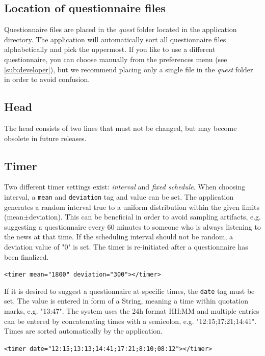 \documentclass[11pt,a4paper,titlepage]{article}
\begin{document}
\subsection{Location of questionnaire files}

Questionnaire files are placed in the \textit{quest} folder located in the application directory. The application will automatically sort all questionnaire files alphabetically and pick the uppermost. If you like to use a different questionnaire, you can choose manually from the preferences menu (see \ref{sub:developer}), but we recommend placing only a single file in the \textit{quest} folder in order to avoid confusion. 

\subsection{Head}

The head consists of two lines that must not be changed, but may become obsolete in future releases.

\subsection{Timer} 





Two different timer settings exist: \textit{interval} and \textit{fixed schedule}. When choosing interval, a \texttt{mean} and \texttt{deviation} tag and value can be set. The application generates a random interval true to a uniform distribution within the given limits (mean$\pm$deviation). This can be beneficial in order to avoid sampling artifacts, e.g. suggesting a questionnaire every 60 minutes to someone who is always listening to the news at that time. If the scheduling interval should not be random, a deviation value of "0" is set. The timer is re-initiated after a questionnaire has been finalized.
%
\begin{center}
\begin{tcolorbox}[colback=black!10!white,colframe=black!50!white]
\texttt{<timer mean="1800" deviation="300"></timer>}
\end{tcolorbox}
\end{center}
%
If it is desired to suggest a questionnaire at specific times, the \texttt{date} tag must be set. The value is entered in form of a String, meaning a time within quotation marks, e.g. "13:47". The system uses the 24h format HH:MM and multiple entries can be entered by concatenating times with a semicolon, e.g. "12:15;17:21;14:41". Times are sorted automatically by the application. 
%
\begin{center}
\begin{tcolorbox}[colback=black!10!white,colframe=black!50!white]
\texttt{<timer date="12:15;13:13;14:41;17:21;8:10;08:12"></timer>}
\end{tcolorbox}
\end{center}
\end{document}
